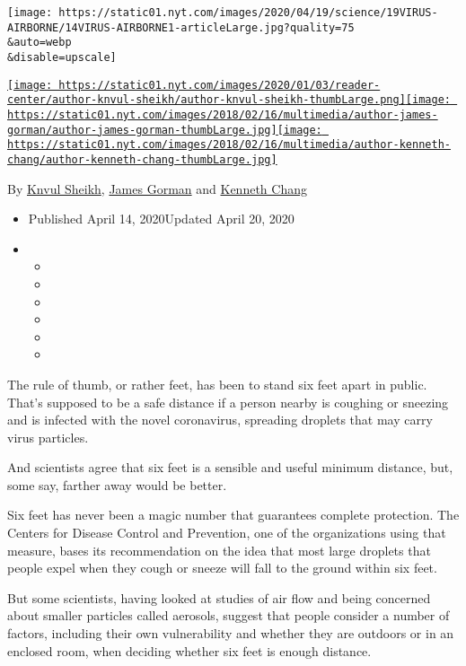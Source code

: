 \texttt{[image: https://static01.nyt.com/images/2020/04/19/science/19VIRUS-AIRBORNE/14VIRUS-AIRBORNE1-articleLarge.jpg?quality=75\\\&auto=webp\\\&disable=upscale]}

\href{https://www.nytimes.com/by/knvul-sheikh}{\texttt{[image: https://static01.nyt.com/images/2020/01/03/reader-center/author-knvul-sheikh/author-knvul-sheikh-thumbLarge.png]}}\href{https://www.nytimes.com/by/james-gorman}{\texttt{[image: https://static01.nyt.com/images/2018/02/16/multimedia/author-james-gorman/author-james-gorman-thumbLarge.jpg]}}\href{https://www.nytimes.com/by/kenneth-chang}{\texttt{[image: https://static01.nyt.com/images/2018/02/16/multimedia/author-kenneth-chang/author-kenneth-chang-thumbLarge.jpg]}}

By \href{https://www.nytimes.com/by/knvul-sheikh}{Knvul Sheikh},
\href{https://www.nytimes.com/by/james-gorman}{James Gorman} and
\href{https://www.nytimes.com/by/kenneth-chang}{Kenneth Chang}

\begin{itemize}
\item
  Published April 14, 2020Updated April 20, 2020
\item
  \begin{itemize}
  \item
  \item
  \item
  \item
  \item
  \item
  \end{itemize}
\end{itemize}

The rule of thumb, or rather feet, has been to stand six feet apart in
public. That's supposed to be a safe distance if a person nearby is
coughing or sneezing and is infected with the novel coronavirus,
spreading droplets that may carry virus particles.

And scientists agree that six feet is a sensible and useful minimum
distance, but, some say, farther away would be better.

Six feet has never been a magic number that guarantees complete
protection. The Centers for Disease Control and Prevention, one of the
organizations using that measure, bases its recommendation on the idea
that most large droplets that people expel when they cough or sneeze
will fall to the ground within six feet.

But some scientists, having looked at studies of air flow and being
concerned about smaller particles called aerosols, suggest that people
consider a number of factors, including their own vulnerability and
whether they are outdoors or in an enclosed room, when deciding whether
six feet is enough distance.


